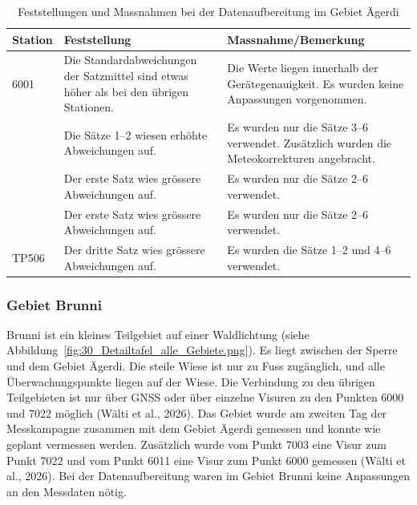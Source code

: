 \begin{table}[htbp]
    \centering
    \begin{tabularx}{\textwidth}{p{2.2cm} X X}
        \toprule
        Station & Feststellung & Massnahme/Bemerkung \\
        \midrule
        6001 & Die Standardabweichungen der Satzmittel sind etwas höher
        als bei den übrigen Stationen. & Die Werte liegen innerhalb der
        Gerätegenauigkeit. Es wurden keine Anpassungen vorgenommen. \\
        \addlinespace
        6003 & Die Sätze 1--2 wiesen erhöhte Abweichungen auf. &
        Es wurden nur die Sätze 3--6 verwendet.
        Zusätzlich wurden die Meteokorrekturen angebracht. \\
        \addlinespace
        6016 & Der erste Satz wies grössere Abweichungen auf. &
        Es wurden nur die Sätze 2--6 verwendet. \\
        \addlinespace
        7001 & Der erste Satz wies grössere Abweichungen auf. &
        Es wurden nur die Sätze 2--6 verwendet. \\
        \addlinespace
        TP506 & Der dritte Satz wies grössere Abweichungen auf. &
        Es wurden die Sätze 1--2 und 4--6 verwendet. \\
        \bottomrule
    \end{tabularx}
    \caption{Feststellungen und Massnahmen bei der Datenaufbereitung
    im Gebiet Ägerdi}
    \label{tab:feststellungen-aegerdi}
\end{table}

\subsubsection{Gebiet Brunni}
\label{sec:gebiet-brunni}
Brunni ist ein kleines Teilgebiet auf einer Waldlichtung (siehe Abbildung~\ref{fig:30_Detailtafel_alle_Gebiete.png}). Es liegt zwischen der Sperre und dem Gebiet Ägerdi. 
Die steile Wiese ist nur zu Fuss zugänglich, und alle Überwachungspunkte liegen auf
der Wiese. Die Verbindung zu den übrigen Teilgebieten ist nur über GNSS
oder über einzelne Visuren zu den Punkten 6000 und 7022 möglich (Wälti et al., 2026). Das Gebiet wurde am zweiten Tag der
Messkampagne zusammen mit dem Gebiet Ägerdi gemessen und konnte wie
geplant vermessen werden. Zusätzlich wurde vom Punkt 7003 eine Visur
zum Punkt 7022 und vom Punkt 6011 eine Visur zum Punkt 6000 gemessen
(Wälti et al., 2026). Bei der Datenaufbereitung waren im
Gebiet Brunni keine Anpassungen an den Messdaten nötig.


